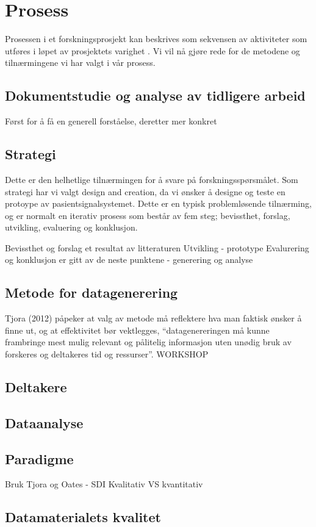 \section{Prosess}
\label{chp: prosess}

Prosessen i et forskningsprosjekt kan beskrives som sekvensen av aktiviteter som utføres i løpet av prosjektets varighet \cite{Oates}. Vi vil nå gjøre rede for de metodene og tilnærmingene vi har valgt i vår prosess.

\subsection{Dokumentstudie og analyse av tidligere arbeid}
	Først for å få en generell forståelse, deretter mer konkret
	
\subsection{Strategi}
Dette er den helhetlige tilnærmingen for å svare på forskningsspørsmålet. Som strategi har vi valgt design and creation, da vi ønsker å designe og teste en protoype av pasientsignalsystemet. Dette er en typisk problemløsende tilnærming, og er normalt en iterativ prosess som består av fem steg; bevissthet, forslag, utvikling, evaluering og konklusjon. 

	Bevissthet og forslag et resultat av litteraturen
	Utvikling - prototype
	Evalurering og konklusjon er gitt av de neste punktene - generering og analyse

\subsection{Metode for datagenerering}
Tjora (2012) påpeker at valg av metode må reflektere hva man faktisk ønsker å finne ut, og at effektivitet bør vektlegges, “datagenereringen må kunne frambringe mest mulig relevant og pålitelig informasjon uten unødig bruk av forskeres og deltakeres tid og ressurser”.
WORKSHOP

\subsection{Deltakere}

\subsection{Dataanalyse}

\subsection{Paradigme}
Bruk Tjora og Oates - SDI
Kvalitativ VS kvantitativ

\subsection{Datamaterialets kvalitet}


